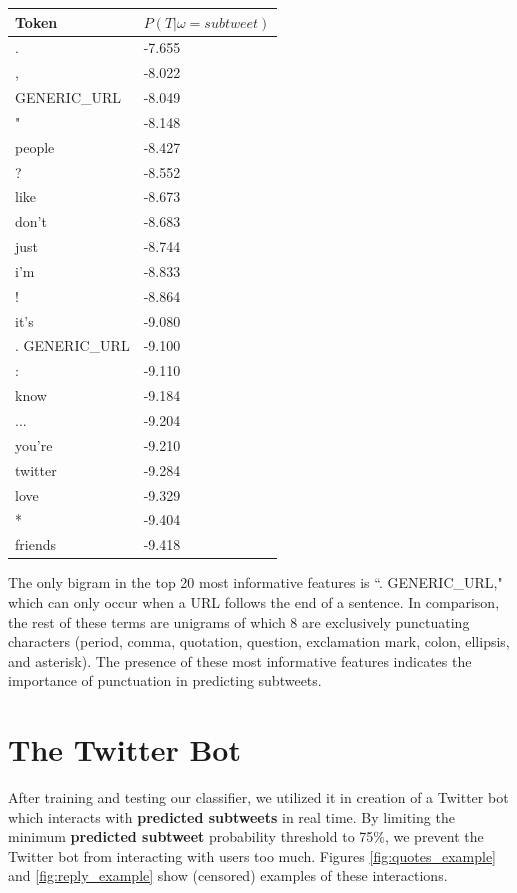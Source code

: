 \documentclass[11pt, twoside, reqno]{book}
\begin{document}
\begin{center}
\begin{tabular}{ | p{8em} | p{8.5em} | }
\hline
Token & $P(T|\omega=subtweet)$ \\ \hline
.       & -7.655 \\
,       & -8.022 \\
GENERIC\_URL& -8.049 \\
"       & -8.148 \\
people  & -8.427 \\
?       & -8.552 \\
like    & -8.673 \\
don't   & -8.683 \\
just    & -8.744 \\
i'm     & -8.833 \\
!       & -8.864 \\
it's    & -9.080 \\
. GENERIC\_URL   & -9.100 \\
:       & -9.110 \\
know    & -9.184 \\
...     & -9.204 \\
you're  & -9.210 \\
twitter & -9.284 \\
love    & -9.329 \\
*       & -9.404 \\
friends & -9.418 \\
\hline
\end{tabular}
\end{center}

\noindent
The only bigram in the top 20 most informative features is ``. GENERIC\_URL," which can only occur when a URL follows the end of a sentence. In comparison, the rest of these terms are unigrams of which 8 are exclusively punctuating characters (period, comma, quotation, question, exclamation mark, colon, ellipsis, and asterisk). The presence of these most informative features indicates the importance of punctuation in predicting subtweets.

\section{The Twitter Bot}
\label{the_twitter_bot}

After training and testing our classifier, we utilized it in creation of a Twitter bot which interacts with \textbf{predicted subtweets} in real time. By limiting the minimum \textbf{predicted subtweet} probability threshold to 75\%, we prevent the Twitter bot from interacting with users too much. Figures \ref{fig:quotes_example} and \ref{fig:reply_example} show (censored) examples of these interactions.
\end{document}
